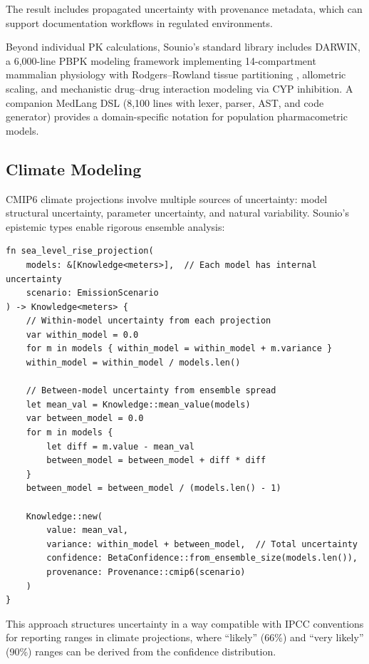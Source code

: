 \documentclass[11pt,a4paper]{article}
\begin{document}
The result includes propagated uncertainty with provenance metadata,
which can support documentation workflows in regulated environments.

Beyond individual PK calculations, Sounio's standard library includes
DARWIN, a 6,000-line PBPK modeling framework implementing 14-compartment
mammalian physiology with Rodgers--Rowland tissue partitioning
\citep{rodgers2005tissue}, allometric scaling, and mechanistic drug--drug
interaction modeling via CYP inhibition. A companion MedLang DSL
(8,100 lines with lexer, parser, AST, and code generator) provides a
domain-specific notation for population pharmacometric models.

\subsection{Climate Modeling}

CMIP6 climate projections involve multiple sources of uncertainty: model
structural uncertainty, parameter uncertainty, and natural variability.
Sounio's epistemic types enable rigorous ensemble analysis:

\begin{lstlisting}[caption={Climate ensemble analysis with structured uncertainty}]
fn sea_level_rise_projection(
    models: &[Knowledge<meters>],  // Each model has internal uncertainty
    scenario: EmissionScenario
) -> Knowledge<meters> {
    // Within-model uncertainty from each projection
    var within_model = 0.0
    for m in models { within_model = within_model + m.variance }
    within_model = within_model / models.len()

    // Between-model uncertainty from ensemble spread
    let mean_val = Knowledge::mean_value(models)
    var between_model = 0.0
    for m in models {
        let diff = m.value - mean_val
        between_model = between_model + diff * diff
    }
    between_model = between_model / (models.len() - 1)

    Knowledge::new(
        value: mean_val,
        variance: within_model + between_model,  // Total uncertainty
        confidence: BetaConfidence::from_ensemble_size(models.len()),
        provenance: Provenance::cmip6(scenario)
    )
}
\end{lstlisting}

This approach structures uncertainty in a way compatible with IPCC
conventions for reporting ranges in climate projections, where
``likely'' (66\%) and ``very likely'' (90\%) ranges can be derived
from the confidence distribution.
\end{document}
